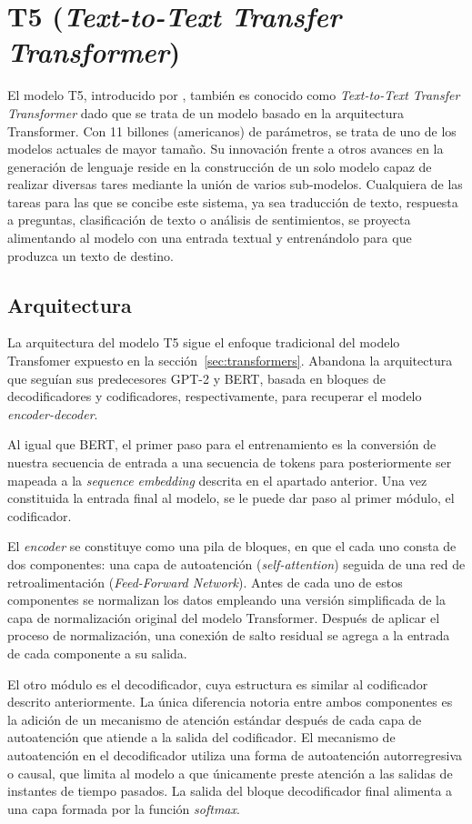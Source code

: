 \section{T5 (\textit{Text-to-Text Transfer Transformer})}
El modelo T5, introducido por \citep{2020t5}, también es conocido como \textit{Text-to-Text Transfer Transformer} dado que se trata de un modelo basado en la arquitectura Transformer. Con 11 billones (americanos) de parámetros, se trata de uno de los modelos actuales de mayor tamaño. Su innovación frente a otros avances en la generación de lenguaje reside en la construcción de un solo modelo capaz de realizar diversas tares mediante la unión de varios sub-modelos. Cualquiera de las tareas para las que se concibe este sistema, ya sea traducción de texto, respuesta a preguntas, clasificación de texto o análisis de sentimientos, se proyecta alimentando al modelo con una entrada textual y entrenándolo para que produzca un texto de destino. 



\subsection{Arquitectura}\hfill

La arquitectura del modelo T5 sigue el enfoque tradicional del modelo Transfomer expuesto en la sección~\ref{sec:transformers}. Abandona la arquitectura que seguían sus predecesores GPT-2 y BERT, basada en bloques de decodificadores y codificadores, respectivamente, para recuperar el modelo \textit{encoder-decoder}.

Al igual que BERT, el primer paso para el entrenamiento es la conversión de nuestra secuencia de entrada a una secuencia de tokens para posteriormente ser mapeada a la \textit{sequence embedding} descrita en el apartado anterior. Una vez constituida la entrada final al modelo, se le puede dar paso al primer módulo, el codificador. 

El \textit{encoder} se constituye como una pila de bloques, en que el cada uno consta de dos componentes: una capa de autoatención (\textit{self-attention}) seguida de una red de retroalimentación (\textit{Feed-Forward Network}). Antes de cada uno de estos componentes se normalizan los datos empleando una versión simplificada de la capa de normalización original del modelo Transformer. Después de aplicar el proceso de normalización, una conexión de salto residual se agrega a la entrada de cada componente a su salida.

El otro módulo es el decodificador, cuya estructura es similar al codificador descrito anteriormente. La única diferencia notoria entre ambos componentes es la adición de un mecanismo de atención estándar después de cada capa de autoatención que atiende a la salida del codificador. El mecanismo de autoatención en el decodificador utiliza una forma de autoatención autorregresiva o causal, que limita al modelo a que únicamente preste atención a las salidas de instantes de tiempo pasados. La salida del bloque decodificador final alimenta a una capa formada por la función \textit{softmax}.




